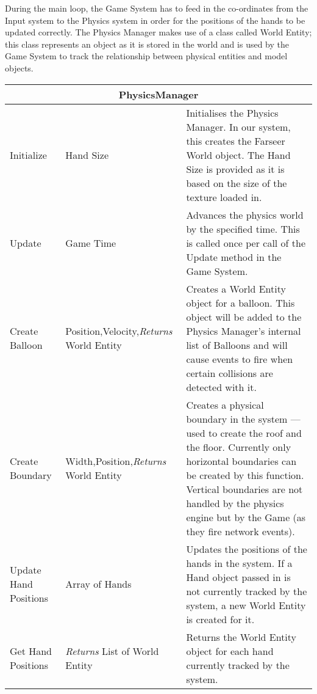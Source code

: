 During the main loop, the Game System has to feed in the co-ordinates from the
Input system to the Physics system in order for the positions of the hands to 
be updated correctly. The Physics Manager makes use of a class called World
Entity; this class represents an object as it is stored in the world and is 
used by the Game System to track the relationship between physical entities and
model objects.

\begin{table}[H]
\begin{longtable}{|p{4.5cm}|p{3.5cm}|p{7.7cm}|}
\hline
\multicolumn{3}{|c|}{PhysicsManager} \\ \hline

Initialize & Hand Size &
Initialises the Physics Manager. In our system, this creates the Farseer World
object. The Hand Size is provided as it is based on the size of the texture 
loaded in. \\ \hline

Update & Game Time &
Advances the physics world by the specified time. This is called once per call
of the Update method in the Game System.\\ \hline

Create Balloon & Position,\newline Velocity,\newline \emph{Returns} World Entity &
Creates a World Entity object for a balloon. This object will be added to the 
Physics Manager's internal list of Balloons and will cause events to fire when
certain collisions are detected with it.\\ \hline

Create Boundary & Width,\newline Position,\newline \emph{Returns} World Entity &
Creates a physical boundary in the system --- used to create the roof and the 
floor. Currently only horizontal boundaries can be created by this function.
Vertical boundaries are not handled by the physics engine but by the Game (as 
they fire network events).\\ \hline

Update Hand Positions & Array of Hands &
Updates the positions of the hands in the system. If a Hand object passed in 
is not currently tracked by the system, a new World Entity is created for it.
\\ \hline

Get Hand Positions & \emph{Returns} List of World Entity &
Returns the World Entity object for each hand currently tracked by the system.
\\ \hline


\end{longtable}
\end{table}
